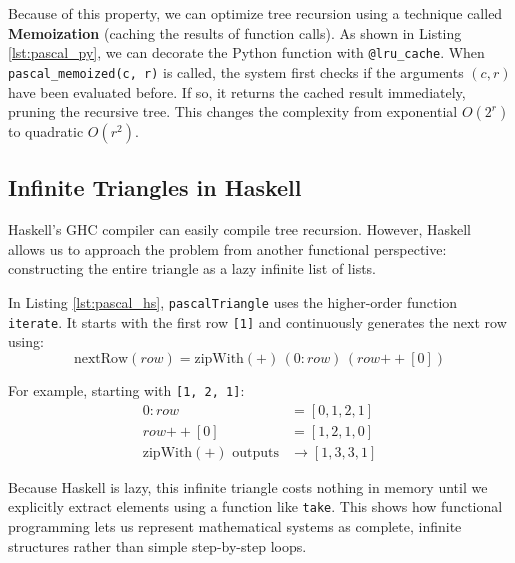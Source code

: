 Because of this property, we can optimize tree recursion using a technique called \textbf{Memoization} (caching the results of function calls). As shown in Listing \ref{lst:pascal_py}, we can decorate the Python function with \texttt{@lru\_cache}. When \texttt{pascal\_memoized(c, r)} is called, the system first checks if the arguments $(c, r)$ have been evaluated before. If so, it returns the cached result immediately, pruning the recursive tree. This changes the complexity from exponential $O(2^r)$ to quadratic $O(r^2)$.

\subsection{Infinite Triangles in Haskell}

Haskell's GHC compiler can easily compile tree recursion. However, Haskell allows us to approach the problem from another functional perspective: constructing the entire triangle as a lazy infinite list of lists.



In Listing \ref{lst:pascal_hs}, \texttt{pascalTriangle} uses the higher-order function \texttt{iterate}. It starts with the first row \texttt{[1]} and continuously generates the next row using:
\[
\text{nextRow}(row) = \text{zipWith}(+) \, (0 : row) \, (row \mathbin{++} [0])
\]

For example, starting with \texttt{[1, 2, 1]}:
\begin{align*}
0 : row &= [0, 1, 2, 1] \\
row \mathbin{++} [0] &= [1, 2, 1, 0] \\
\text{zipWith}(+) \text{ outputs} &\rightarrow [1, 3, 3, 1]
\end{align*}

Because Haskell is lazy, this infinite triangle costs nothing in memory until we explicitly extract elements using a function like \texttt{take}. This shows how functional programming lets us represent mathematical systems as complete, infinite structures rather than simple step-by-step loops.
